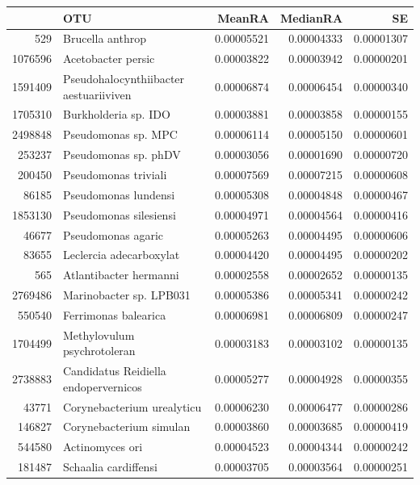 \begin{table}[ht]
\centering
\begin{tabular}{rlrrr}
  \hline
 & OTU & MeanRA & MedianRA & SE \\ 
  \hline
529 & Brucella anthrop & 0.00005521 & 0.00004333 & 0.00001307 \\ 
  1076596 & Acetobacter persic & 0.00003822 & 0.00003942 & 0.00000201 \\ 
  1591409 & Pseudohalocynthiibacter aestuariiviven & 0.00006874 & 0.00006454 & 0.00000340 \\ 
  1705310 & Burkholderia sp. IDO & 0.00003881 & 0.00003858 & 0.00000155 \\ 
  2498848 & Pseudomonas sp. MPC & 0.00006114 & 0.00005150 & 0.00000601 \\ 
  253237 & Pseudomonas sp. phDV & 0.00003056 & 0.00001690 & 0.00000720 \\ 
  200450 & Pseudomonas triviali & 0.00007569 & 0.00007215 & 0.00000608 \\ 
  86185 & Pseudomonas lundensi & 0.00005308 & 0.00004848 & 0.00000467 \\ 
  1853130 & Pseudomonas silesiensi & 0.00004971 & 0.00004564 & 0.00000416 \\ 
  46677 & Pseudomonas agaric & 0.00005263 & 0.00004495 & 0.00000606 \\ 
  83655 & Leclercia adecarboxylat & 0.00004420 & 0.00004495 & 0.00000202 \\ 
  565 & Atlantibacter hermanni & 0.00002558 & 0.00002652 & 0.00000135 \\ 
  2769486 & Marinobacter sp. LPB031 & 0.00005386 & 0.00005341 & 0.00000242 \\ 
  550540 & Ferrimonas balearica & 0.00006981 & 0.00006809 & 0.00000247 \\ 
  1704499 & Methylovulum psychrotoleran & 0.00003183 & 0.00003102 & 0.00000135 \\ 
  2738883 & Candidatus Reidiella endopervernicos & 0.00005277 & 0.00004928 & 0.00000355 \\ 
  43771 & Corynebacterium urealyticu & 0.00006230 & 0.00006477 & 0.00000286 \\ 
  146827 & Corynebacterium simulan & 0.00003860 & 0.00003685 & 0.00000419 \\ 
  544580 & Actinomyces ori & 0.00004523 & 0.00004344 & 0.00000242 \\ 
  181487 & Schaalia cardiffensi & 0.00003705 & 0.00003564 & 0.00000251 \\ 

\end{tabular}
\end{table}

